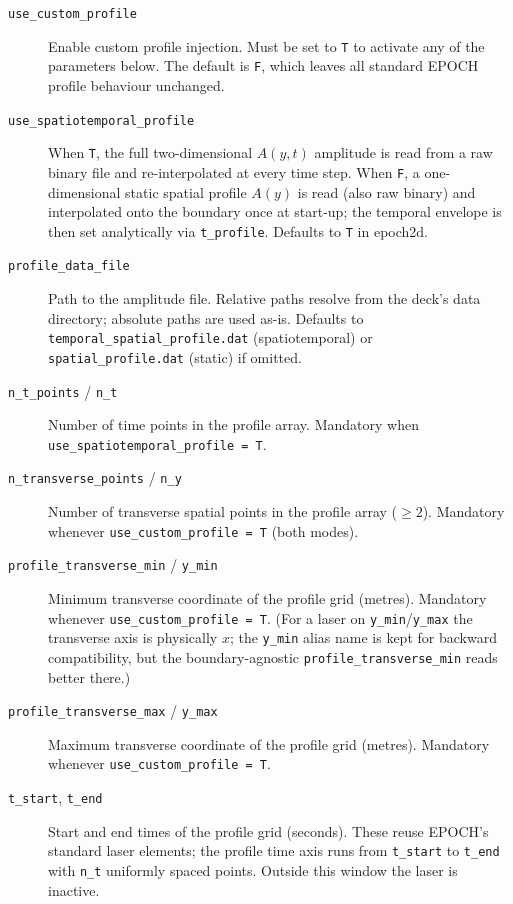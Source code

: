 \documentclass[11pt,a4paper]{article}
\begin{document}
\begin{description}
  \item[\texttt{use\_custom\_profile}] Enable custom profile injection.
    Must be set to \texttt{T} to activate any of the parameters below. The
    default is \texttt{F}, which leaves all standard EPOCH profile
    behaviour unchanged.

  \item[\texttt{use\_spatiotemporal\_profile}] When \texttt{T}, the full
    two-dimensional $A(y, t)$ amplitude is read from a raw binary file and
    re-interpolated at every time step. When \texttt{F}, a one-dimensional
    static spatial profile $A(y)$ is read (also raw binary) and
    interpolated onto the boundary once at start-up; the temporal
    envelope is then set analytically via \texttt{t\_profile}. Defaults
    to \texttt{T} in epoch2d. 

  \item[\texttt{profile\_data\_file}] Path to the amplitude file. Relative
    paths resolve from the deck's data directory; absolute paths are used
    as-is. Defaults to \texttt{temporal\_spatial\_profile.dat}
    (spatiotemporal) or \texttt{spatial\_profile.dat} (static) if
    omitted.

  \item[\texttt{n\_t\_points} / \texttt{n\_t}] Number of time points in
    the profile array. Mandatory when
    \texttt{use\_spatiotemporal\_profile = T}.

  \item[\texttt{n\_transverse\_points} / \texttt{n\_y}] Number of
    transverse spatial points in the profile array ($\geq 2$). Mandatory
    whenever \texttt{use\_custom\_profile = T} (both modes).

  \item[\texttt{profile\_transverse\_min} / \texttt{y\_min}] Minimum
    transverse coordinate of the profile grid (metres). Mandatory
    whenever \texttt{use\_custom\_profile = T}. (For a laser on
    \texttt{y\_min}/\texttt{y\_max} the transverse axis is physically
    $x$; the \texttt{y\_min} alias name is kept for backward
    compatibility, but the boundary-agnostic
    \texttt{profile\_transverse\_min} reads better there.)

  \item[\texttt{profile\_transverse\_max} / \texttt{y\_max}] Maximum
    transverse coordinate of the profile grid (metres). Mandatory
    whenever \texttt{use\_custom\_profile = T}.

  \item[\texttt{t\_start}, \texttt{t\_end}] Start and end times of the
    profile grid (seconds). These reuse EPOCH's standard laser elements;
    the profile time axis runs from \texttt{t\_start} to \texttt{t\_end}
    with \texttt{n\_t} uniformly spaced points. Outside this window the
    laser is inactive.


\end{description}
\end{document}
